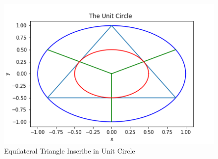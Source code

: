 \documentclass[10pt,journal,compsoc]{IEEEtran} \ifCLASSOPTIONcompsoc
\begin{document}
\begin{figure}[H]
\centering\includegraphics[width=1\linewidth,height=0.3\textheight]{Fig05}
\caption{Equilateral Triangle Inscribe in     Unit Circle}
\label{fig:Fig05}
\end{figure}
\end{document}
